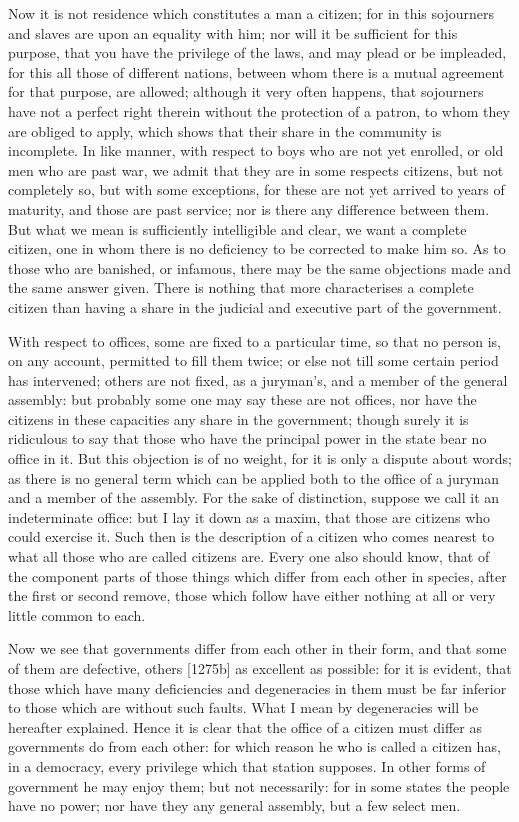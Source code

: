 Now it is not residence which constitutes a man a citizen; for in this
sojourners and slaves are upon an equality with him; nor will it be
sufficient for this purpose, that you have the privilege of the laws, and
may plead or be impleaded, for this all those of different nations,
between whom there is a mutual agreement for that purpose, are allowed;
although it very often happens, that sojourners have not a perfect right
therein without the protection of a patron, to whom they are obliged to
apply, which shows that their share in the community is incomplete. In
like manner, with respect to boys who are not yet enrolled, or old men who
are past war, we admit that they are in some respects citizens, but not
completely so, but with some exceptions, for these are not yet arrived to
years of maturity, and those are past service; nor is there any difference
between them. But what we mean is sufficiently intelligible and clear, we
want a complete citizen, one in whom there is no deficiency to be
corrected to make him so. As to those who are banished, or infamous, there
may be the same objections made and the same answer given. There is
nothing that more characterises a complete citizen than having a share in
the judicial and executive part of the government.

With respect to offices, some are fixed to a particular time, so that no
person is, on any account, permitted to fill them twice; or else not till
some certain period has intervened; others are not fixed, as a juryman's,
and a member of the general assembly: but probably some one may say these
are not offices, nor have the citizens in these capacities any share in
the government; though surely it is ridiculous to say that those who have
the principal power in the state bear no office in it. But this objection
is of no weight, for it is only a dispute about words; as there is no
general term which can be applied both to the office of a juryman and a
member of the assembly. For the sake of distinction, suppose we call it an
indeterminate office: but I lay it down as a maxim, that those are
citizens who could exercise it. Such then is the description of a citizen
who comes nearest to what all those who are called citizens are. Every one
also should know, that of the component parts of those things which differ
from each other in species, after the first or second remove, those which
follow have either nothing at all or very little common to each.

Now we see that governments differ from each other in their form, and that
some of them are defective, others [1275b] as excellent as possible: for
it is evident, that those which have many deficiencies and degeneracies in
them must be far inferior to those which are without such faults. What I
mean by degeneracies will be hereafter explained. Hence it is clear that
the office of a citizen must differ as governments do from each other: for
which reason he who is called a citizen has, in a democracy, every
privilege which that station supposes. In other forms of government he may
enjoy them; but not necessarily: for in some states the people have no
power; nor have they any general assembly, but a few select men.

